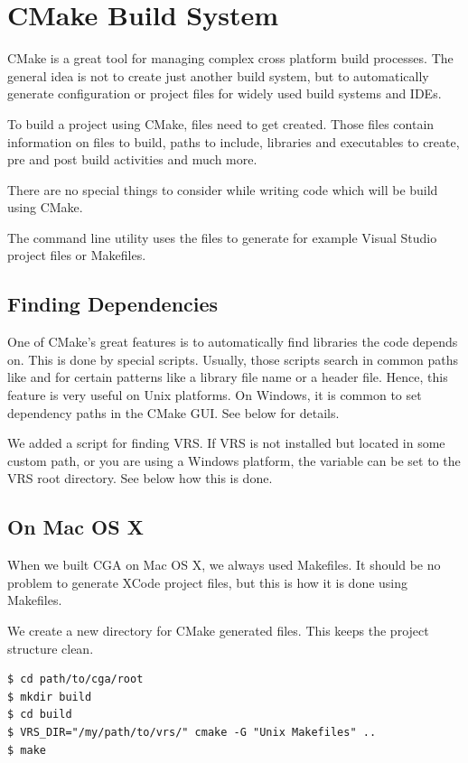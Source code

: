 
\section{CMake Build System} CMake is a great tool for managing complex cross platform build processes. The general idea is not to create just another build system, but to automatically generate configuration or project files for widely used build systems and IDEs.

To build a project using CMake,  files need to get created. Those files contain information on files to build, paths to include, libraries and executables to create, pre and post build activities and much more.

There are no special things to consider while writing code which will be build using CMake.

The  command line utility uses the  files to generate for example Visual Studio project files or Makefiles.

\subsection{Finding Dependencies} One of CMake's great features is to automatically find libraries the code depends on. This is done by special scripts. Usually, those scripts search in common paths like  and  for certain patterns like a library file name or a header file. Hence, this feature is very useful on Unix platforms. On Windows, it is common to set dependency paths in the CMake GUI. See below for details.

We added a script for finding VRS. If VRS is not installed but located in some custom path, or you are using a Windows platform, the variable  can be set to the VRS root directory. See below how this is done.

\subsection{On Mac OS X} When we built CGA on Mac OS X, we always used Makefiles. It should be no problem to generate XCode project files, but this is how it is done using Makefiles.

We create a new directory for CMake generated files. This keeps the project structure clean.
\begin{verbatim}
$ cd path/to/cga/root
$ mkdir build
$ cd build
$ VRS_DIR="/my/path/to/vrs/" cmake -G "Unix Makefiles" ..
$ make
\end{verbatim}

